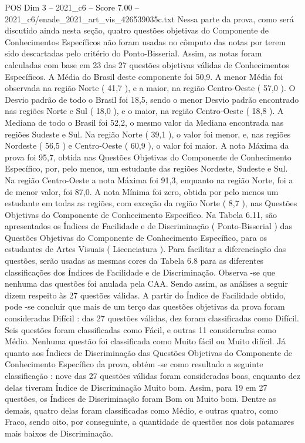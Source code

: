 \begin{textsample}{POS Dim 3 – 2021\_c6 – Score 7.00 – 2021\_c6/enade\_2021\_art\_vis\_426539035c.txt}
Nessa parte da prova, como será discutido ainda nesta seção, quatro questões objetivas do Componente de Conhecimentos Específicos não foram usadas no cômputo das notas por terem sido descartadas pelo critério do Ponto-Bisserial.
Assim, as notas foram calculadas com base em 23 das 27 questões objetivas válidas de Conhecimentos Específicos.
A Média do Brasil deste componente foi 50,9.
A menor Média foi observada na região Norte ( 41,7 ), e a maior, na região Centro-Oeste ( 57,0 ).
O Desvio padrão de todo o Brasil foi 18,5, sendo o menor Desvio padrão encontrado nas regiões Norte e Sul ( 18,0 ), e o maior, na região Centro-Oeste ( 18,8 ).
A Mediana de todo o Brasil foi 52,2, o mesmo valor da Mediana encontrada nas regiões Sudeste e Sul.
Na região Norte ( 39,1 ), o valor foi menor, e, nas regiões Nordeste ( 56,5 ) e Centro-Oeste ( 60,9 ), o valor foi maior.
A nota Máxima da prova foi 95,7, obtida nas Questões Objetivas do Componente de Conhecimento Específico, por, pelo menos, um estudante das regiões Nordeste, Sudeste e Sul.
Na região Centro-Oeste a nota Máxima foi 91,3, enquanto na região Norte, foi a de menor valor, foi 87,0.
A nota Mínima foi zero, obtida por pelo menos um estudante em todas as regiões, com exceção da região Norte ( 8,7 ), nas Questões Objetivas do Componente de Conhecimento Específico.
Na Tabela 6.11, são apresentados os Índices de Facilidade e de Discriminação ( Ponto-Bisserial ) das Questões Objetivas do Componente de Conhecimento Específico, para os estudantes de Artes Visuais ( Licenciatura ).
Para facilitar a diferenciação das questões, serão usadas as mesmas cores da Tabela 6.8 para as diferentes classificações dos Índices de Facilidade e de Discriminação.
Observa -se que nenhuma das questões foi anulada pela CAA.
Sendo assim, as análises a seguir dizem respeito às 27 questões válidas.
A partir do Índice de Facilidade obtido, pode -se concluir que mais de um terço das questões objetivas da prova foram consideradas Difícil : das 27 questões válidas, dez foram classificadas como Difícil.
Seis questões foram classificadas como Fácil, e outras 11 consideradas como Médio.
Nenhuma questão foi classificada como Muito fácil ou Muito difícil.
Já quanto aos Índices de Discriminação das Questões Objetivas do Componente de Conhecimento Específico da prova, obtém -se como resultado a seguinte classificação : nove das 27 questões válidas foram consideradas boas, enquanto dez delas tiveram Índice de Discriminação Muito bom.
Assim, para 19 em 27 questões, os Índices de Discriminação foram Bom ou Muito bom.
Dentre as demais, quatro delas foram classificadas como Médio, e outras quatro, como Fraco, sendo oito, por conseguinte, a quantidade de questões nos dois patamares mais baixos de Discriminação.

\end{textsample}
